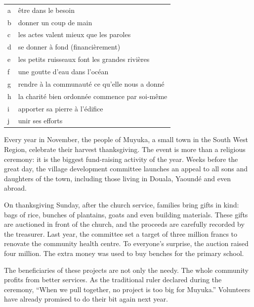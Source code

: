 \documentclass[11pt]{article}
\newcounter{popsec}
\newcounter{popsub}
\newcommand{\courssub}[1]{%
  \stepcounter{popsub}%
  \par\vspace{9pt}\noindent{\popxbold\fontsize{11.5}{13}\selectfont\color{popink}{\color{poporange}\thepopsec.\thepopsub}\hspace{6pt}#1}\par\nopagebreak\vspace{4pt}
}
\begin{document}
\begin{exercice}
\begin{center}
\begin{tabularx}{\linewidth}{|l X|}
\hline
\rowcolor{popgreenL} \multicolumn{2}{|l|}{\textbf{Équivalents français}} \\
\hline
a & être dans le besoin \\
b & donner un coup de main \\
c & les actes valent mieux que les paroles \\
d & se donner à fond (financièrement) \\
e & les petits ruisseaux font les grandes rivières \\
f & une goutte d'eau dans l'océan \\
g & rendre à la communauté ce qu'elle nous a donné \\
h & la charité bien ordonnée commence par soi-même \\
i & apporter sa pierre à l'édifice \\
j & unir ses efforts \\
\hline
\end{tabularx}
\end{center}
\end{exercice}

\courssub{Je me prépare au Bac}

\begin{textebox}
Every year in November, the people of Muyuka, a small town in the South West Region, celebrate their harvest thanksgiving. The event is more than a religious ceremony: it is the biggest fund-raising activity of the year. Weeks before the great day, the village development committee launches an appeal to all sons and daughters of the town, including those living in Douala, Yaoundé and even abroad.

On thanksgiving Sunday, after the church service, families bring gifts in kind: bags of rice, bunches of plantains, goats and even building materials. These gifts are auctioned in front of the church, and the proceeds are carefully recorded by the treasurer. Last year, the committee set a target of three million francs to renovate the community health centre. To everyone's surprise, the auction raised four million. The extra money was used to buy benches for the primary school.

The beneficiaries of these projects are not only the needy. The whole community profits from better services. As the traditional ruler declared during the ceremony, “When we pull together, no project is too big for Muyuka.” Volunteers have already promised to do their bit again next year.
\end{textebox}
\end{document}
